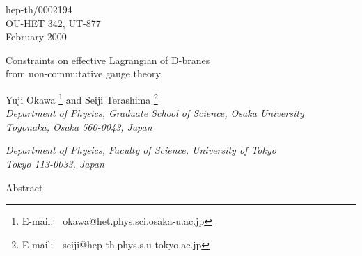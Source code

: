\documentclass[a4paper,12pt]{article}
\begin{document}
\baselineskip=0.7cm
\renewcommand{\theequation}{\arabic{section}.\arabic{equation}}
\renewcommand{\thesection}{\arabic{section}.}
\renewcommand{\thesubsection}{\arabic{section}.\arabic{subsection}}
\makeatletter
\def\section{\@startsection{section}{1}{\z@}{-3.5ex plus -1ex minus
 -.2ex}{2.3ex plus .2ex}{\large}}
\def\subsection{\@startsection{subsection}{2}{\z@}{-3.25ex plus -1ex minus
 -.2ex}{1.5ex plus .2ex}{\normalsize\it}}
\def\appendix{
\par
\setcounter{section}{0}
\setcounter{subsection}{0}
\def\thesection{\Alph{section}}}
\makeatother
\def\thefootnote{\fnsymbol{footnote}}
\begin{flushright}
hep-th/0002194\\
OU-HET 342, UT-877
\\
February 2000
\end{flushright}
\vspace{1cm}
\begin{center}
\Large
Constraints on effective Lagrangian of D-branes\\ from
non-commutative gauge theory

\vspace{1cm}
\normalsize
{\sc Yuji Okawa}\coordHE{}
\footnote{
E-mail:\ \ okawa@het.phys.sci.osaka-u.ac.jp}
and 
{\sc Seiji Terashima}\coordHE{}
\footnote{
E-mail:\ \ seiji@hep-th.phys.s.u-tokyo.ac.jp}
\\

\vspace{0.3cm}
{\it {}\coordHE{} Department of Physics,
Graduate School of Science, Osaka University\\
Toyonaka, Osaka 560-0043, Japan}

\vspace{0.3cm}
{\it {}\coordHE{} Department of Physics,
Faculty of Science, University of Tokyo\\
Tokyo 113-0033, Japan}

\vspace{1.3cm}
Abstract\\

\end{center}
\end{document}
